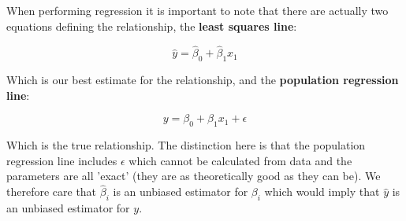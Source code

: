 When performing regression it is important to note that there are actually two equations defining the relationship, the \textbf{least squares line}:

$$ \hat{y} = \hat{\beta}_{0} + \hat{\beta}_{1}x_{1} $$

Which is our best estimate for the relationship, and the \textbf{population regression line}:

$$ y = \beta_{0} + \beta_{1}x_{1} + \epsilon $$

Which is the true relationship. The distinction here is that the population regression line includes $\epsilon$ which cannot be calculated from data and the parameters are all 'exact' (they are as theoretically good as they can be). We therefore care that $\hat{\beta}_{i}$ is an unbiased estimator for $\beta_{i}$ which would imply that $\hat{y}$ is an unbiased estimator for $y$. 
